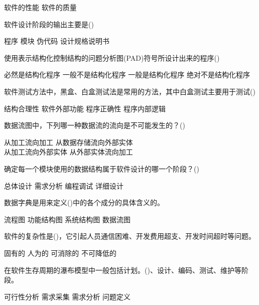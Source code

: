 \documentclass[answers]{exam}
\begin{document}
\begin{questions}
\begin{oneparchoices}
		\choice 软件的性能
		\choice 软件的质量
	\end{oneparchoices}
	\question 软件设计阶段的输出主要是()\\
	\begin{oneparchoices}
		\choice 程序
		\choice 模块
		\choice 伪代码
		\choice 设计规格说明书
	\end{oneparchoices}
	\question 使用表示结构化控制结构的问题分析图(PAD)符号所设计出来的程序()\\
	\begin{oneparchoices}
		\choice 必然是结构化程序
		\choice 一般不是结构化程序
		\choice 一般是结构化程序
		\choice 绝对不是结构化程序
	\end{oneparchoices}
	\question 软件测试方法中，黑盒、白盒测试法是常用的方法，其中白盒测试主要用于测试()\\
	\begin{oneparchoices}
		\choice 结构合理性
		\choice 软件外部功能
		\choice 程序正确性
		\choice 程序内部逻辑
	\end{oneparchoices}
	\question 数据流图中，下列哪一种数据流的流向是不可能发生的？()\\
	\begin{oneparchoices}
		\choice 从加工流向加工
		\choice 从数据存储流向外部实体\\
		\choice 从加工流向外部实体
		\choice 从外部实体流向加工
	\end{oneparchoices}
	\question 确定每一个模块使用的数据结构属于软件设计的哪一个阶段？()\\
	\begin{oneparchoices}
		\choice 总体设计
		\choice 需求分析
		\choice 编程调试
		\choice 详细设计
	\end{oneparchoices}
	\question 数据字典是用来定义()中的各个成分的具体含义的。\\
	\begin{oneparchoices}
		\choice 流程图
		\choice 功能结构图
		\choice 系统结构图
		\choice 数据流图
	\end{oneparchoices}
	\question 软件的复杂性是()，它引起人员通信困难、开发费用超支、开发时间超时等问题。\\
	\begin{oneparchoices}
		\choice 固有的
		\choice 人为的
		\choice 可消除的
		\choice 不可降低的
	\end{oneparchoices}
	\question 在软件生存周期的瀑布模型中一般包括计划。()、设计、编码、测试、维护等阶段。\\
	\begin{oneparchoices}
		\choice 可行性分析
		\choice 需求采集
		\choice 需求分析
		\choice 问题定义
	\end{oneparchoices}
\end{questions}
\end{document}
